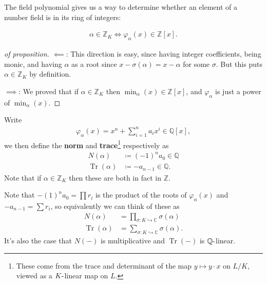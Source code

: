 \begin{remark}

The field polynomial gives us a way to determine whether an element of a
number field is in its ring of integers:

\end{remark}

\begin{proposition}

\begin{align*}
\alpha\in {\mathbb{Z}}_K \iff \varphi_{ \alpha}(x) \in {\mathbb{Z}}[x]
.\end{align*}

\end{proposition}

\begin{proof}[of proposition]

\(\impliedby\): This direction is easy, since having integer
coefficients, being monic, and having \(\alpha\) as a root since
\(x - \sigma( \alpha) = x - \alpha\) for some \(\sigma\). But this puts
\(\alpha \in {\mathbb{Z}}_K\) by definition.

\(\implies\): We proved that if \(\alpha\in {\mathbb{Z}}_K\) then
\(\min_ \alpha(x) \in {\mathbb{Z}}[x]\), and \(\varphi_{ \alpha}\) is
just a power of \(\min_ \alpha(x)\).

\end{proof}

\begin{definition}

Write
\begin{align*}
\varphi_{ \alpha} (x) = x^n + \sum_{i=1}^n a_i x^i \in {\mathbb{Q}}[x]
,\end{align*}
we then define the \textbf{norm} and \textbf{trace}\footnote{These come
  from the trace and determinant of the map \(y \mapsto y\cdot x\) on
  \(L/K\), viewed as a \(K{\hbox{-}}\)linear map on \(L\).} respectively
as
\begin{align*}
N( \alpha) &\coloneqq(-1)^n a_0 \in {\mathbb{Q}}\\
\operatorname{Tr}( \alpha) &\coloneqq-a_{n-1} \in {\mathbb{Q}}
.\end{align*}
Note that if \(\alpha \in {\mathbb{Z}}_K\) then these are both in fact
in \({\mathbb{Z}}\).

\end{definition}

\begin{remark}

Note that \(-(1)^n a_0 = \prod r_i\) is the product of the roots of
\(\varphi_{ \alpha} (x)\) and \(-a_{n-1} = \sum r_i\), so equivalently
we can think of these as
\begin{align*}
N( \alpha ) &= \prod_{ \sigma: K \hookrightarrow{\mathbb{C}}} \sigma( \alpha) \\
\operatorname{Tr}( \alpha ) &= \sum_{\sigma: K \hookrightarrow{\mathbb{C}}} \sigma( \alpha) 
.\end{align*}
It's also the case that \(N({-})\) is multiplicative and
\(\operatorname{Tr}({-})\) is \({\mathbb{Q}}{\hbox{-}}\)linear.

\end{remark}

